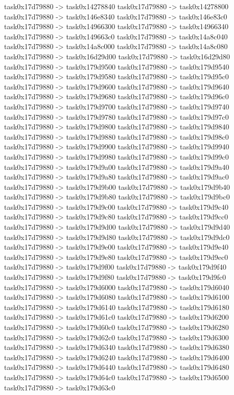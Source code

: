 {	task0x17d79880 -> task0x14278840
	task0x17d79880 -> task0x14278800
	task0x17d79880 -> task0x146e8340
	task0x17d79880 -> task0x146e83c0
	task0x17d79880 -> task0x14966300
	task0x17d79880 -> task0x14966340
	task0x17d79880 -> task0x149663c0
	task0x17d79880 -> task0x14a8c040
	task0x17d79880 -> task0x14a8c000
	task0x17d79880 -> task0x14a8c080
	task0x17d79880 -> task0x16d29d00
	task0x17d79880 -> task0x16d29d80
	task0x17d79880 -> task0x179d9500
	task0x17d79880 -> task0x179d9540
	task0x17d79880 -> task0x179d9580
	task0x17d79880 -> task0x179d95c0
	task0x17d79880 -> task0x179d9600
	task0x17d79880 -> task0x179d9640
	task0x17d79880 -> task0x179d9680
	task0x17d79880 -> task0x179d96c0
	task0x17d79880 -> task0x179d9700
	task0x17d79880 -> task0x179d9740
	task0x17d79880 -> task0x179d9780
	task0x17d79880 -> task0x179d97c0
	task0x17d79880 -> task0x179d9800
	task0x17d79880 -> task0x179d9840
	task0x17d79880 -> task0x179d9880
	task0x17d79880 -> task0x179d98c0
	task0x17d79880 -> task0x179d9900
	task0x17d79880 -> task0x179d9940
	task0x17d79880 -> task0x179d9980
	task0x17d79880 -> task0x179d99c0
	task0x17d79880 -> task0x179d9a00
	task0x17d79880 -> task0x179d9a40
	task0x17d79880 -> task0x179d9a80
	task0x17d79880 -> task0x179d9ac0
	task0x17d79880 -> task0x179d9b00
	task0x17d79880 -> task0x179d9b40
	task0x17d79880 -> task0x179d9b80
	task0x17d79880 -> task0x179d9bc0
	task0x17d79880 -> task0x179d9c00
	task0x17d79880 -> task0x179d9c40
	task0x17d79880 -> task0x179d9c80
	task0x17d79880 -> task0x179d9cc0
	task0x17d79880 -> task0x179d9d00
	task0x17d79880 -> task0x179d9d40
	task0x17d79880 -> task0x179d9d80
	task0x17d79880 -> task0x179d9dc0
	task0x17d79880 -> task0x179d9e00
	task0x17d79880 -> task0x179d9e40
	task0x17d79880 -> task0x179d9e80
	task0x17d79880 -> task0x179d9ec0
	task0x17d79880 -> task0x179d9f00
	task0x17d79880 -> task0x179d9f40
	task0x17d79880 -> task0x179d9f80
	task0x17d79880 -> task0x179d9fc0
	task0x17d79880 -> task0x179d6000
	task0x17d79880 -> task0x179d6040
	task0x17d79880 -> task0x179d6080
	task0x17d79880 -> task0x179d6100
	task0x17d79880 -> task0x179d6140
	task0x17d79880 -> task0x179d6180
	task0x17d79880 -> task0x179d61c0
	task0x17d79880 -> task0x179d6200
	task0x17d79880 -> task0x179d60c0
	task0x17d79880 -> task0x179d6280
	task0x17d79880 -> task0x179d62c0
	task0x17d79880 -> task0x179d6300
	task0x17d79880 -> task0x179d6340
	task0x17d79880 -> task0x179d6380
	task0x17d79880 -> task0x179d6240
	task0x17d79880 -> task0x179d6400
	task0x17d79880 -> task0x179d6440
	task0x17d79880 -> task0x179d6480
	task0x17d79880 -> task0x179d64c0
	task0x17d79880 -> task0x179d6500
	task0x17d79880 -> task0x179d63c0
}
